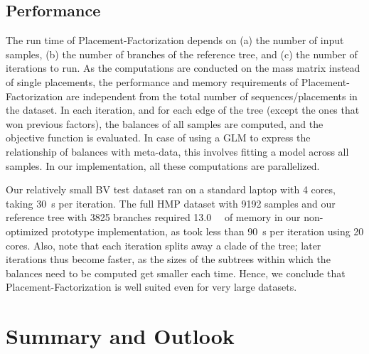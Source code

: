 \subsection{Performance}
\label{ch:Factorization:sec:Evaluation:sub:Performance}

The run time of Placement-Factorization depends on
(a) the number of input samples, (b) the number of branches of the reference tree, and (c) the number of iterations to run.
As the computations are conducted on the mass matrix instead of single placements,
the performance and memory requirements of Placement-Factorization are independent
from the total number of sequences/placements in the dataset.
In each iteration, and for each edge of the tree (except the ones that won previous factors),
the balances of all samples are computed, and the objective function is evaluated.
In case of using a \ac{GLM} to express the relationship of balances with meta-data,
this involves fitting a model across all samples.
In our implementation, all these computations are parallelized.

Our relatively small \ac{BV} test dataset ran on a standard laptop with \num{4} cores,
taking \SI{30}{\second} per iteration.
The full \ac{HMP} dataset with \num{9 192} samples and our reference tree with \num{3 825} branches
required \SI{13.0}{\giga\byte} of memory in our non-optimized prototype implementation,
as took less than \SI{90}{\second} per iteration using \num{20} cores.
Also, note that each iteration splits away a clade of the tree;
later iterations thus become faster,
as the sizes of the subtrees within which the balances need to be computed get smaller each time.
Hence, we conclude that Placement-Factorization is well suited even for very large datasets.


\section{Summary and Outlook}
\label{ch:Factorization:sec:SummaryOutlook}

